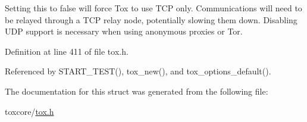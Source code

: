 Setting this to false will force Tox to use T\+C\+P only. Communications will need to be relayed through a T\+C\+P relay node, potentially slowing them down. Disabling U\+D\+P support is necessary when using anonymous proxies or Tor. 

Definition at line 411 of file tox.\+h.



Referenced by S\+T\+A\+R\+T\+\_\+\+T\+E\+S\+T(), tox\+\_\+new(), and tox\+\_\+options\+\_\+default().



The documentation for this struct was generated from the following file\+:\begin{DoxyCompactItemize}
\item 
toxcore/\hyperlink{tox_8h}{tox.\+h}\end{DoxyCompactItemize}
